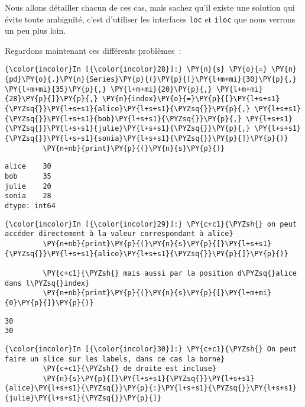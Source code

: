 Nous allons détailler chacun de ces cas, mais sachez qu'il existe une
solution qui évite toute ambiguïté, c'est d'utiliser les interfaces
\texttt{loc} et \texttt{iloc} que nous verrons un peu plus loin.

Regardons maintenant ces différents problèmes~:

    \begin{Verbatim}[commandchars=\\\{\}]
{\color{incolor}In [{\color{incolor}28}]:} \PY{n}{s} \PY{o}{=} \PY{n}{pd}\PY{o}{.}\PY{n}{Series}\PY{p}{(}\PY{p}{[}\PY{l+m+mi}{30}\PY{p}{,} \PY{l+m+mi}{35}\PY{p}{,} \PY{l+m+mi}{20}\PY{p}{,} \PY{l+m+mi}{28}\PY{p}{]}\PY{p}{,} \PY{n}{index}\PY{o}{=}\PY{p}{[}\PY{l+s+s1}{\PYZsq{}}\PY{l+s+s1}{alice}\PY{l+s+s1}{\PYZsq{}}\PY{p}{,} \PY{l+s+s1}{\PYZsq{}}\PY{l+s+s1}{bob}\PY{l+s+s1}{\PYZsq{}}\PY{p}{,} \PY{l+s+s1}{\PYZsq{}}\PY{l+s+s1}{julie}\PY{l+s+s1}{\PYZsq{}}\PY{p}{,} \PY{l+s+s1}{\PYZsq{}}\PY{l+s+s1}{sonia}\PY{l+s+s1}{\PYZsq{}}\PY{p}{]}\PY{p}{)}
         \PY{n+nb}{print}\PY{p}{(}\PY{n}{s}\PY{p}{)}
\end{Verbatim}


    \begin{Verbatim}[commandchars=\\\{\}]
alice    30
bob      35
julie    20
sonia    28
dtype: int64

    \end{Verbatim}

    \begin{Verbatim}[commandchars=\\\{\}]
{\color{incolor}In [{\color{incolor}29}]:} \PY{c+c1}{\PYZsh{} on peut accéder directement à la valeur correspondant à alice}
         \PY{n+nb}{print}\PY{p}{(}\PY{n}{s}\PY{p}{[}\PY{l+s+s1}{\PYZsq{}}\PY{l+s+s1}{alice}\PY{l+s+s1}{\PYZsq{}}\PY{p}{]}\PY{p}{)}
         
         \PY{c+c1}{\PYZsh{} mais aussi par la position d\PYZsq{}alice dans l\PYZsq{}index}
         \PY{n+nb}{print}\PY{p}{(}\PY{n}{s}\PY{p}{[}\PY{l+m+mi}{0}\PY{p}{]}\PY{p}{)}
\end{Verbatim}


    \begin{Verbatim}[commandchars=\\\{\}]
30
30

    \end{Verbatim}

    \begin{Verbatim}[commandchars=\\\{\}]
{\color{incolor}In [{\color{incolor}30}]:} \PY{c+c1}{\PYZsh{} On peut faire un slice sur les labels, dans ce cas la borne}
         \PY{c+c1}{\PYZsh{} de droite est incluse}
         \PY{n}{s}\PY{p}{[}\PY{l+s+s1}{\PYZsq{}}\PY{l+s+s1}{alice}\PY{l+s+s1}{\PYZsq{}}\PY{p}{:}\PY{l+s+s1}{\PYZsq{}}\PY{l+s+s1}{julie}\PY{l+s+s1}{\PYZsq{}}\PY{p}{]}
\end{Verbatim}


